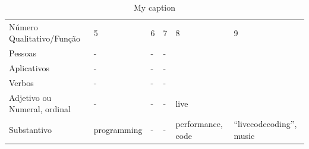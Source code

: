 \begin{table}[]
\centering
\caption{My caption}
\label{my-label}
\begin{tabular}{llllll}
Número Qualitativo/Função & 5 & 6 & 7 & 8 & 9 \\
Pessoas & - & - & - &  &  \\
Aplicativos & - & - & - &  &  \\
Verbos & - & - & - &  &  \\
Adjetivo ou Numeral, ordinal & - & - & - & live &  \\
Substantivo & programming & - & - & performance, code & “livecodecoding”, music
\end{tabular}
\end{table}

